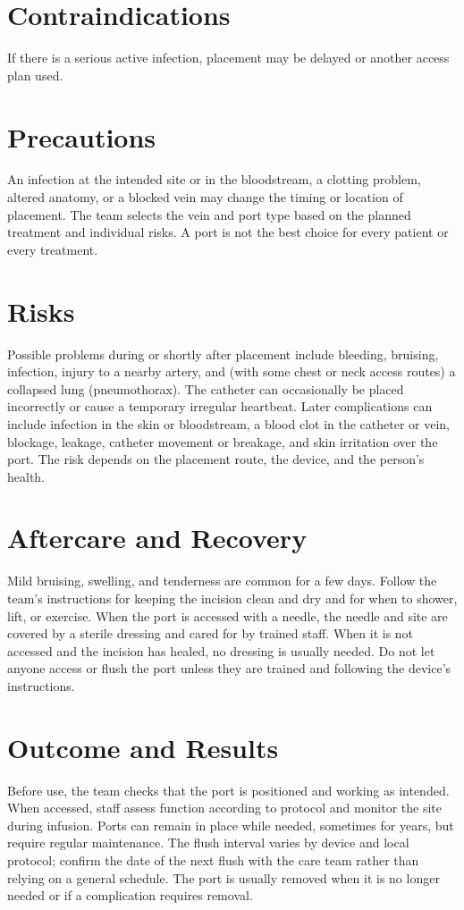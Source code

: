 \section*{Contraindications}
If there is a serious active infection, placement may be delayed or another access plan used.

\section*{Precautions}
An infection at the intended site or in the bloodstream, a clotting problem, altered anatomy, or a blocked vein may change the timing or location of placement. The team selects the vein and port type based on the planned treatment and individual risks. A port is not the best choice for every patient or every treatment.

\section*{Risks}
Possible problems during or shortly after placement include bleeding, bruising, infection, injury to a nearby artery, and (with some chest or neck access routes) a collapsed lung (pneumothorax). The catheter can occasionally be placed incorrectly or cause a temporary irregular heartbeat. Later complications can include infection in the skin or bloodstream, a blood clot in the catheter or vein, blockage, leakage, catheter movement or breakage, and skin irritation over the port. The risk depends on the placement route, the device, and the person's health.

\section*{Aftercare and Recovery}
Mild bruising, swelling, and tenderness are common for a few days. Follow the team's instructions for keeping the incision clean and dry and for when to shower, lift, or exercise. When the port is accessed with a needle, the needle and site are covered by a sterile dressing and cared for by trained staff. When it is not accessed and the incision has healed, no dressing is usually needed. Do not let anyone access or flush the port unless they are trained and following the device's instructions.

\section*{Outcome and Results}
Before use, the team checks that the port is positioned and working as intended. When accessed, staff assess function according to protocol and monitor the site during infusion. Ports can remain in place while needed, sometimes for years, but require regular maintenance. The flush interval varies by device and local protocol; confirm the date of the next flush with the care team rather than relying on a general schedule. The port is usually removed when it is no longer needed or if a complication requires removal.

